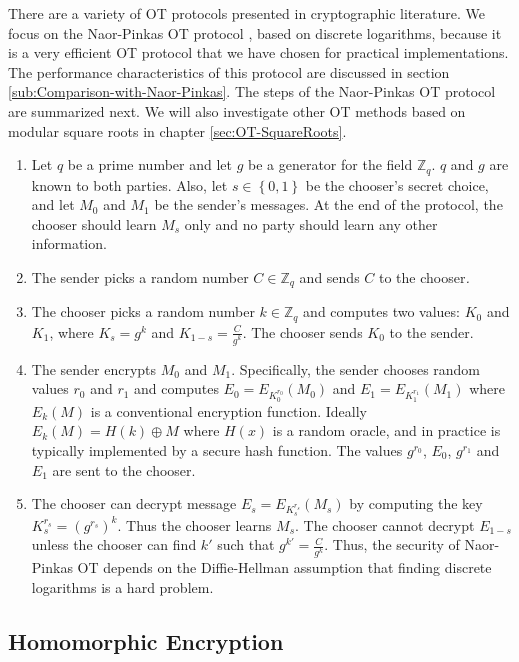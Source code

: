 There are a variety of OT protocols presented in cryptographic literature.
We focus on the Naor-Pinkas OT protocol \cite{NaorPinkas99}, based
on discrete logarithms, because it is a very efficient OT protocol
that we have chosen for practical implementations. The performance
characteristics of this protocol are discussed in section \ref{sub:Comparison-with-Naor-Pinkas}.
The steps of the Naor-Pinkas OT protocol are summarized next. We will
also investigate other OT methods based on modular square roots in
chapter \ref{sec:OT-SquareRoots}.
\begin{enumerate}
\item Let $q$ be a prime number and let $g$ be a generator for the field
$\mathbb{Z}_{q}$. $q$ and $g$ are known to both parties. Also,
let $s\in\left\{ 0,1\right\} $ be the chooser's secret choice, and
let $M_{0}$ and $M_{1}$ be the sender's messages. At the end of
the protocol, the chooser should learn $M_{s}$ only and no party
should learn any other information.
\item The sender picks a random number $C\in\mathbb{Z}_{q}$ and sends $C$
to the chooser\emph{.}
\item The chooser picks a random number $k\in\mathbb{Z}_{q}$ and computes
two values: $K_{0}$ and $K_{1}$, where $K_{s}=g^{k}$ and $K_{1-s}=\frac{C}{g^{k}}$.
The chooser sends $K_{0}$ to the sender.
\item The sender encrypts $M_{0}$ and $M_{1}$. Specifically, the sender
chooses random values $r_{0}$ and $r_{1}$ and computes $E_{0}=E_{K_{0}^{r_{0}}}\left(M_{0}\right)$
and $E_{1}=E_{K_{1}^{r_{1}}}\left(M_{1}\right)$ where $E_{k}\left(M\right)$
is a conventional encryption function. Ideally $E_{k}\left(M\right)=H\left(k\right)\oplus M$
where $H\left(x\right)$ is a random oracle, and in practice is typically
implemented by a secure hash function. The values $g^{r_{0}}$, $E_{0}$,
$g^{r_{1}}$ and $E_{1}$ are sent to the chooser.
\item The chooser can decrypt message $E_{s}=E_{K_{s}^{r_{s}}}\left(M_{s}\right)$
by computing the key $K_{s}^{r_{s}}=\left(g^{r_{s}}\right)^{k}$.
Thus the chooser learns $M_{s}$. The chooser cannot decrypt $E_{1-s}$
unless the chooser can find $k'$ such that $g^{k'}=\frac{C}{g^{k}}$.
Thus, the security of Naor-Pinkas OT depends on the Diffie-Hellman
assumption that finding discrete logarithms is a hard problem.
\end{enumerate}

\subsection{Homomorphic Encryption}

